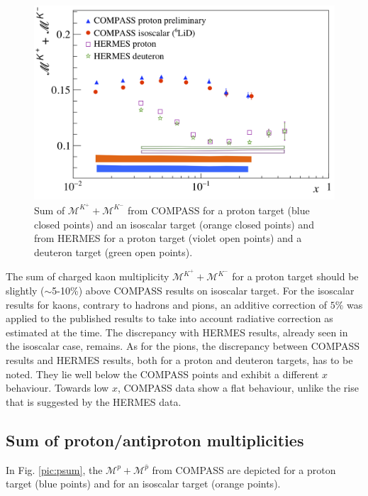 \begin{figure}[!h]
  \centering
  \includegraphics[scale=0.5]{./gfx/Ks.png}
  \caption{Sum of $\mathscr{M}^{K^+}+\mathscr{M}^{K^-}$ from COMPASS for a proton target (blue closed points) and an isoscalar target (orange closed points) and from HERMES for a proton target (violet open points) and a deuteron target (green open points).}
  \label{pic:ksum}
\end{figure}

The sum of charged kaon multiplicity $\mathscr{M}^{K^+}+\mathscr{M}^{K^-}$ for a proton target should be slightly ($\sim$5-10\%) above COMPASS results on isoscalar target. For the isoscalar results for kaons, contrary to hadrons and pions, an additive correction of $5\%$ was applied to the published results to take into account radiative correction as estimated at the time. The discrepancy with HERMES results, already seen in the isoscalar case, remains. As for the pions, the discrepancy between COMPASS results and HERMES results, both for a proton and deuteron targets, has to be noted. They lie well below the COMPASS points and exhibit a different $x$ behaviour. Towards low $x$, COMPASS data show a flat behaviour, unlike the rise that is suggested by the HERMES data.

\subsection{Sum of proton/antiproton multiplicities}

In Fig. \ref{pic:psum}, the $\mathscr{M}^{p}+\mathscr{M}^{\bar{p}}$ from COMPASS are depicted for a proton target (blue points) and for an isoscalar target (orange points).

